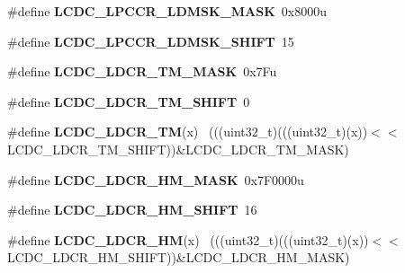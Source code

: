 \begin{DoxyCompactItemize}
\item 
\hypertarget{group___l_c_d_c___register___masks_gaf379d2cceddea2ae434bed04ae54f01e}{}\#define {\bfseries L\+C\+D\+C\+\_\+\+L\+P\+C\+C\+R\+\_\+\+L\+D\+M\+S\+K\+\_\+\+M\+A\+S\+K}~0x8000u\label{group___l_c_d_c___register___masks_gaf379d2cceddea2ae434bed04ae54f01e}

\item 
\hypertarget{group___l_c_d_c___register___masks_ga53e1ea93b2bced75cc21cbdbf15dae53}{}\#define {\bfseries L\+C\+D\+C\+\_\+\+L\+P\+C\+C\+R\+\_\+\+L\+D\+M\+S\+K\+\_\+\+S\+H\+I\+F\+T}~15\label{group___l_c_d_c___register___masks_ga53e1ea93b2bced75cc21cbdbf15dae53}

\item 
\hypertarget{group___l_c_d_c___register___masks_ga6d73cecdc625bc08b049a540e4a5963f}{}\#define {\bfseries L\+C\+D\+C\+\_\+\+L\+D\+C\+R\+\_\+\+T\+M\+\_\+\+M\+A\+S\+K}~0x7\+Fu\label{group___l_c_d_c___register___masks_ga6d73cecdc625bc08b049a540e4a5963f}

\item 
\hypertarget{group___l_c_d_c___register___masks_gab42e3b981432c8434e4e02120420ffc1}{}\#define {\bfseries L\+C\+D\+C\+\_\+\+L\+D\+C\+R\+\_\+\+T\+M\+\_\+\+S\+H\+I\+F\+T}~0\label{group___l_c_d_c___register___masks_gab42e3b981432c8434e4e02120420ffc1}

\item 
\hypertarget{group___l_c_d_c___register___masks_ga3a24ca0bbebf2f3c38fe428b4b566472}{}\#define {\bfseries L\+C\+D\+C\+\_\+\+L\+D\+C\+R\+\_\+\+T\+M}(x)                                                ~(((uint32\+\_\+t)(((uint32\+\_\+t)(x))$<$$<$L\+C\+D\+C\+\_\+\+L\+D\+C\+R\+\_\+\+T\+M\+\_\+\+S\+H\+I\+F\+T))\&L\+C\+D\+C\+\_\+\+L\+D\+C\+R\+\_\+\+T\+M\+\_\+\+M\+A\+S\+K)\label{group___l_c_d_c___register___masks_ga3a24ca0bbebf2f3c38fe428b4b566472}

\item 
\hypertarget{group___l_c_d_c___register___masks_ga17e0b70e4489bcf72747887fe6c17e2d}{}\#define {\bfseries L\+C\+D\+C\+\_\+\+L\+D\+C\+R\+\_\+\+H\+M\+\_\+\+M\+A\+S\+K}~0x7\+F0000u\label{group___l_c_d_c___register___masks_ga17e0b70e4489bcf72747887fe6c17e2d}

\item 
\hypertarget{group___l_c_d_c___register___masks_ga683d5706782110ab329019f05ab8bd2d}{}\#define {\bfseries L\+C\+D\+C\+\_\+\+L\+D\+C\+R\+\_\+\+H\+M\+\_\+\+S\+H\+I\+F\+T}~16\label{group___l_c_d_c___register___masks_ga683d5706782110ab329019f05ab8bd2d}

\item 
\hypertarget{group___l_c_d_c___register___masks_ga700757cc17316ed6cc5d9050b61962a3}{}\#define {\bfseries L\+C\+D\+C\+\_\+\+L\+D\+C\+R\+\_\+\+H\+M}(x)                                                ~(((uint32\+\_\+t)(((uint32\+\_\+t)(x))$<$$<$L\+C\+D\+C\+\_\+\+L\+D\+C\+R\+\_\+\+H\+M\+\_\+\+S\+H\+I\+F\+T))\&L\+C\+D\+C\+\_\+\+L\+D\+C\+R\+\_\+\+H\+M\+\_\+\+M\+A\+S\+K)\label{group___l_c_d_c___register___masks_ga700757cc17316ed6cc5d9050b61962a3}


\end{DoxyCompactItemize}
